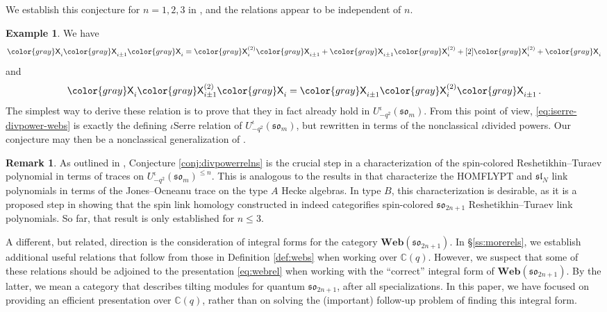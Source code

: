 \documentclass[10pt]{amsart}
\newcommand{\gray}[1]{{\color{gray}#1}}
\numberwithin{equation}{section}
\theoremstyle{definition}
\newtheorem{rem}[thm]{Remark}
\newtheorem{example}[thm]{Example}
\def\C{{\mathbb C}}
\newcommand{\sln}[1][n]{\mathfrak{sl}_{#1}}
\newcommand{\son}[1][2n+1]{\mathfrak{so}_{#1}}
\newcommand{\som}[1][m]{\mathfrak{so}_{#1}}
\newcommand{\Web}{\mathbf{Web}}
\newcommand{\iqUsom}[1][m]{{U}^{\iota}_{-q^2}(\som[#1])}
\newcommand{\xx}{\gray{\mathsf{X}}}
\begin{document}
We establish this conjecture for $n=1,2,3$ in \cite[Proposition 4.41]{BER}, 
and the relations appear to be independent of $n$.

\begin{example}
We have
\begin{equation}\label{eq:iserre-divpower-webs}
\xx_i\xx_{i\pm 1}\xx_i = \xx_i^{(2)}\xx_{i\pm 1} + \xx_{i\pm 1}\xx_i^{(2)} + [2]\xx_i^{(2)} + \xx_i
\end{equation}
and
\begin{equation}
\xx_i\xx_{i\pm 1}^{(2)}\xx_i = \xx_{i\pm 1}\xx_i^{(2)}\xx_{i\pm 1} \, .
\end{equation}
The simplest way to derive these relation is to prove that they in fact already hold in $\iqUsom$. 
From this point of view, 
\eqref{eq:iserre-divpower-webs} is exactly the defining $\iota$Serre relation of $\iqUsom$, 
but rewritten in terms of the nonclassical $\iota$divided powers. 
Our conjecture may then be a nonclassical generalization of \cite{MR4227167}.
\end{example}

\begin{rem}
As outlined in \cite[Theorem 4.45]{BER},
Conjecture \ref{conj:divpowerrelns} is the crucial step in a characterization of 
the spin-colored Reshetikhin--Turaev polynomial in terms of traces on $\iqUsom^{\le n}$. 
This is analogous to the results in \cite[Sections 5 and 6]{Jones2} that characterize the HOMFLYPT 
and $\sln[N]$ link polynomials in terms of the Jones--Ocneanu trace 
on the type $A$ Hecke algebras.
In type $B$, this characterization is desirable, as it is a proposed step in showing that 
the spin link homology constructed in \cite{BER}
indeed categorifies spin-colored $\son$ Reshetikhin--Turaev link polynomials. 
So far, that result is only established for $n\le 3$. 
\end{rem}


A different, but related, direction is the consideration of integral forms 
for the category $\Web(\son)$.
In \S \ref{ss:morerels}, we establish additional useful relations
that follow from those in Definition \ref{def:webs}
when working over $\C(q)$.
However, we suspect that some of these relations should be 
adjoined to the presentation \eqref{eq:webrel}
when working with the ``correct'' integral form of $\Web(\son)$.
By the latter, we mean a category that describes tilting modules for 
quantum $\son$, after all specializations. 
In this paper, we have focused on providing an efficient presentation over $\C(q)$, 
rather than on solving the (important) follow-up problem of finding this integral form.
\end{document}
